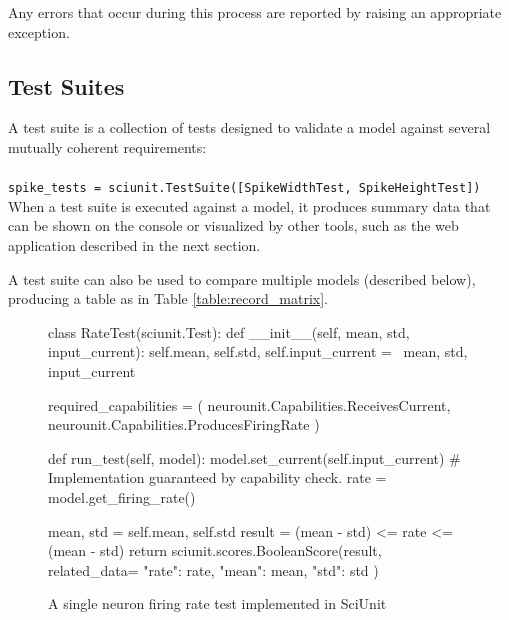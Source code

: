 \documentclass[a4paper,12pt]{article}
\begin{document}
Any errors that occur during this process are reported by raising an appropriate exception.

\subsection{Test Suites}
A test suite is a collection of tests designed to validate a model against several mutually coherent requirements:
\\
\\
\verb|spike_tests = sciunit.TestSuite([SpikeWidthTest, SpikeHeightTest])|
\\

When a test suite is executed against a model, it produces summary data that can be shown on the console or visualized by other tools, such as the web application described in the next section.

A test suite can also be used to compare multiple models (described below), producing a table as in Table \ref{table:record_matrix}.

\begin{figure}
\caption{A single neuron firing rate test implemented in SciUnit}
\label{rate_test}
\begin{python}
class RateTest(sciunit.Test):
	def __init__(self, mean, std, input_current):
		self.mean, self.std, self.input_current = \
		mean, std, input_current
	
	required_capabilities = (
		neurounit.Capabilities.ReceivesCurrent,
		neurounit.Capabilities.ProducesFiringRate
	)
	
	def run_test(self, model):
		model.set_current(self.input_current) 
		# Implementation guaranteed by capability check.  
		rate = model.get_firing_rate()
		
		mean, std = self.mean, self.std
		result = (mean - std) <= rate <= (mean - std)
		return sciunit.scores.BooleanScore(result, related_data={
			"rate": rate,
			"mean": mean,
			"std": std
		})
\end{python}
\end{figure}
\end{document}
